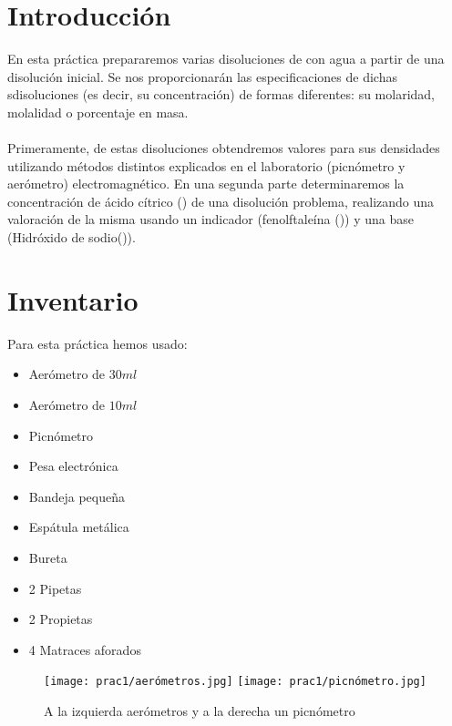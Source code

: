 \section{Introducción}  %
    \noindent En esta práctica prepararemos varias disoluciones de   con agua a partir de una disolución inicial. Se nos proporcionarán las especificaciones de dichas sdisoluciones (es decir, su concentración) de formas diferentes: su molaridad, molalidad o porcentaje en masa.
    \\ \\Primeramente, de estas disoluciones obtendremos valores para sus densidades utilizando métodos distintos explicados en el laboratorio (picnómetro y aerómetro) electromagnético. En una segunda parte determinaremos la concentración de ácido cítrico () de una disolución problema, realizando una valoración de la misma usando un indicador (fenolftaleína ()) y una base (Hidróxido de sodio()).

\section{Inventario}
\noindent Para esta práctica hemos usado:

\begin{multicols}{2}
    \begin{itemize}
        \item Aerómetro de $30 ml$
        \item Aerómetro de $10 ml$
        \item Picnómetro
        \item Pesa electrónica
        \item Bandeja pequeña
        \item Espátula metálica
        \item Bureta
        \item 2 Pipetas
        \item 2 Propietas
        \item 4 Matraces aforados
    \end{itemize}
\end{multicols}

\begin{figure}[H]
    \centering
    \texttt{[image: prac1/aerómetros.jpg]}\hfill
    \texttt{[image: prac1/picnómetro.jpg]}
    \caption{A la izquierda aerómetros y a la derecha un picnómetro}
    \vspace{-1cm}
\end{figure}

